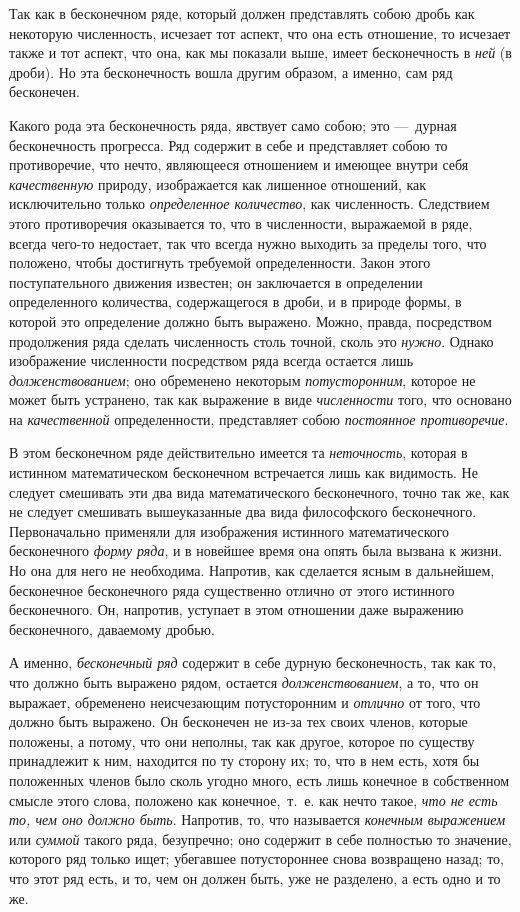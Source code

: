 Так как в бесконечном ряде, который должен представлять собою дробь как
некоторую численность, исчезает тот аспект, что она есть отношение, то
исчезает также и тот аспект, что она, как мы показали выше, имеет
бесконечность в {\em ней} (в дроби). Но эта
бесконечность вошла другим образом, а именно, сам ряд бесконечен.

Какого рода эта бесконечность ряда, явствует само собою; это —~дурная
бесконечность прогресса. Ряд содержит в себе и представляет собою то
противоречие, что нечто, являющееся отношением и имеющее внутри себя
{\em качественную} природу, изображается как лишенное
отношений, как исключительно только {\em определенное
количество}, как численность. Следствием этого противоречия оказывается то,
что в численности, выражаемой в ряде, всегда чего-то недостает, так что
всегда нужно выходить за пределы того, что положено, чтобы достигнуть
требуемой определенности. Закон этого поступательного движения известен; он
заключается в определении определенного количества, содержащегося в дроби,
и в природе формы, в которой это определение должно быть выражено. Можно,
правда, посредством продолжения ряда сделать численность столь точной,
сколь это {\em нужно}. Однако изображение численности
посредством ряда всегда остается лишь
{\em долженствованием}; оно обременено некоторым
{\em потусторонним}, которое не может быть устранено,
так как выражение в виде {\em численности} того, что
основано на {\em качественной} определенности,
представляет собою {\em постоянное противоречие}.

\label{bkm:bm52a}В этом бесконечном ряде действительно имеется та
{\em неточность}, которая в истинном математическом
бесконечном встречается лишь как видимость. Не следует смешивать эти два
вида математического бесконечного, точно так же, как не следует смешивать
вышеуказанные два вида философского бесконечного. Первоначально применяли
для изображения истинного математического бесконечного
{\em форму ряда}, и в новейшее время она опять была
вызвана к жизни. Но она для него не необходима. Напротив, как сделается
ясным в дальнейшем, бесконечное бесконечного ряда существенно отлично от
этого истинного бесконечного. Он, напротив, уступает в этом отношении даже
выражению бесконечного, даваемому дробью.

А именно, {\em бесконечный ряд} содержит в себе дурную
бесконечность, так как то, что должно быть выражено рядом, остается
{\em долженствованием}, а то, что он выражает,
обременено неисчезающим потусторонним и {\em отлично}
от того, что должно быть выражено. Он бесконечен не из-за тех своих членов,
которые положены, а потому, что они неполны, так как другое, которое по
существу принадлежит к ним, находится по ту сторону их; то, что в нем есть,
хотя бы положенных членов было сколь угодно много, есть лишь конечное в
собственном смысле этого слова, положено как конечное,~т.~е. как нечто
такое, {\em что не есть то, чем оно должно быть}.
Напротив, то, что называется {\em конечным выражением}
или {\em суммой} такого ряда, безупречно; оно содержит
в себе полностью то значение, которого ряд только ищет; убегавшее
потустороннее снова возвращено назад; то, что этот ряд есть, и то, чем он
должен быть, уже не разделено, а есть одно и то же.

